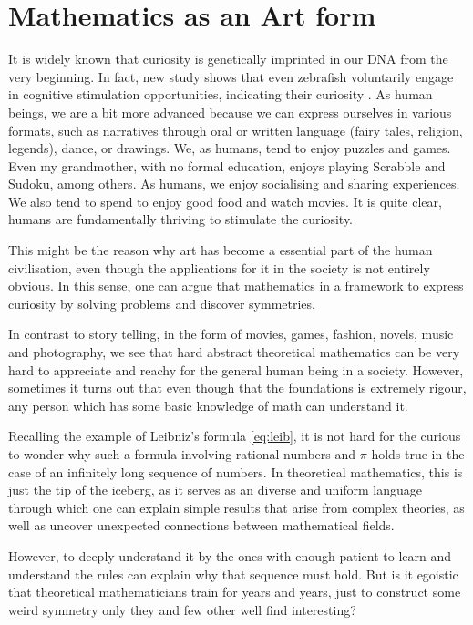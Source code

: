 \documentclass[10pt,conference]{IEEEtran}
\begin{document}
\begin{sloppy}
\begin{itemize}
\end{itemize}


\newpage
\section{Mathematics as an Art form}%
\label{sec:mathematics_for_stimulating_intellectual_mind}


It is widely known that curiosity is genetically imprinted in our DNA from the very beginning.
In fact, new study shows that even zebrafish voluntarily engage in cognitive stimulation opportunities, indicating their curiosity \cite{franks2023curiosity}.
As human beings, we are a bit more advanced because we can express ourselves in various formats, such as narratives through oral or written language (fairy tales, religion, legends), dance, or drawings. We, as humans, tend to enjoy puzzles and games.
Even my grandmother, with no formal education, enjoys playing Scrabble and Sudoku, among others.
As humans, we enjoy socialising and sharing experiences. We also tend to spend to enjoy good food and watch movies. It is quite clear, humans are fundamentally thriving to stimulate the curiosity.

This might be the reason why art has become a essential part of the human civilisation, even though the applications for it in the society is not entirely obvious.
In this sense, one can argue that mathematics in a framework to express curiosity by
solving problems and discover symmetries.

In contrast to story telling, in the form of movies, games, fashion, novels, music and photography, we see that hard abstract theoretical mathematics can be very hard to appreciate and reachy for the general human being in a society. However,
sometimes it turns out that even though that the foundations is extremely rigour, any person which has some basic knowledge of math can understand it.

Recalling the example of Leibniz's formula \eqref{eq:leib}, it is not hard for the curious to wonder why such a formula involving rational numbers and $\pi$ holds true in the case of an infinitely long sequence of numbers. In theoretical mathematics,
this is just the tip of the iceberg, as it serves as an diverse and uniform language through which one can explain simple results that arise from complex theories, as well as uncover unexpected connections between mathematical fields.

However, to deeply understand it by the ones with enough patient to learn and understand the rules can explain why that sequence must hold.
     But is it egoistic that theoretical mathematicians train for years and years, just to construct some weird symmetry only they and few other well find interesting?



    \printbibliography
\end{sloppy}
\end{document}
